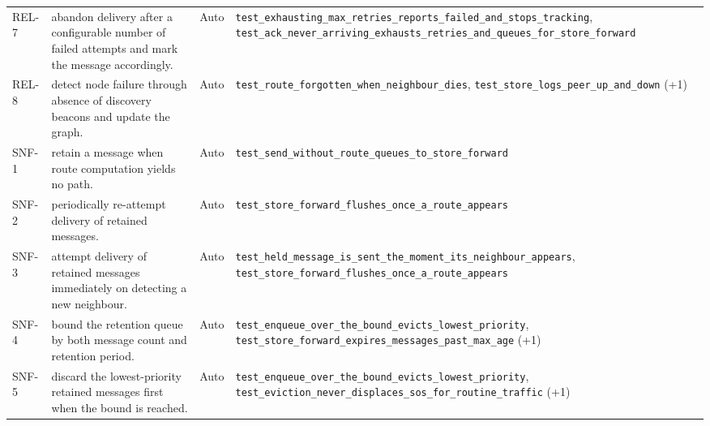 \begin{longtable}{@{}p{0.95cm}p{6.6cm}p{1.15cm}p{8.6cm}@{}}
REL-7 & abandon delivery after a configurable number of failed attempts and mark the message accordingly. & Auto & \texttt{test\_\allowbreak{}exhausting\_\allowbreak{}max\_\allowbreak{}retries\_\allowbreak{}reports\_\allowbreak{}failed\_\allowbreak{}and\_\allowbreak{}stops\_\allowbreak{}tracking}, \texttt{test\_\allowbreak{}ack\_\allowbreak{}never\_\allowbreak{}arriving\_\allowbreak{}exhausts\_\allowbreak{}retries\_\allowbreak{}and\_\allowbreak{}queues\_\allowbreak{}for\_\allowbreak{}store\_\allowbreak{}forward} \\
REL-8 & detect node failure through absence of discovery beacons and update the graph. & Auto & \texttt{test\_\allowbreak{}route\_\allowbreak{}forgotten\_\allowbreak{}when\_\allowbreak{}neighbour\_\allowbreak{}dies}, \texttt{test\_\allowbreak{}store\_\allowbreak{}logs\_\allowbreak{}peer\_\allowbreak{}up\_\allowbreak{}and\_\allowbreak{}down} (+1) \\
SNF-1 & retain a message when route computation yields no path. & Auto & \texttt{test\_\allowbreak{}send\_\allowbreak{}without\_\allowbreak{}route\_\allowbreak{}queues\_\allowbreak{}to\_\allowbreak{}store\_\allowbreak{}forward} \\
SNF-2 & periodically re-attempt delivery of retained messages. & Auto & \texttt{test\_\allowbreak{}store\_\allowbreak{}forward\_\allowbreak{}flushes\_\allowbreak{}once\_\allowbreak{}a\_\allowbreak{}route\_\allowbreak{}appears} \\
SNF-3 & attempt delivery of retained messages immediately on detecting a new neighbour. & Auto & \texttt{test\_\allowbreak{}held\_\allowbreak{}message\_\allowbreak{}is\_\allowbreak{}sent\_\allowbreak{}the\_\allowbreak{}moment\_\allowbreak{}its\_\allowbreak{}neighbour\_\allowbreak{}appears}, \texttt{test\_\allowbreak{}store\_\allowbreak{}forward\_\allowbreak{}flushes\_\allowbreak{}once\_\allowbreak{}a\_\allowbreak{}route\_\allowbreak{}appears} \\
SNF-4 & bound the retention queue by both message count and retention period. & Auto & \texttt{test\_\allowbreak{}enqueue\_\allowbreak{}over\_\allowbreak{}the\_\allowbreak{}bound\_\allowbreak{}evicts\_\allowbreak{}lowest\_\allowbreak{}priority}, \texttt{test\_\allowbreak{}store\_\allowbreak{}forward\_\allowbreak{}expires\_\allowbreak{}messages\_\allowbreak{}past\_\allowbreak{}max\_\allowbreak{}age} (+1) \\
SNF-5 & discard the lowest-priority retained messages first when the bound is reached. & Auto & \texttt{test\_\allowbreak{}enqueue\_\allowbreak{}over\_\allowbreak{}the\_\allowbreak{}bound\_\allowbreak{}evicts\_\allowbreak{}lowest\_\allowbreak{}priority}, \texttt{test\_\allowbreak{}eviction\_\allowbreak{}never\_\allowbreak{}displaces\_\allowbreak{}sos\_\allowbreak{}for\_\allowbreak{}routine\_\allowbreak{}traffic} (+1) \\

\end{longtable}
